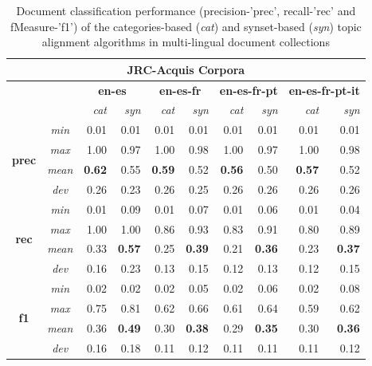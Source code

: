 \begin{table}[ht]\centering
\begin{center}
\small
\begin{tabular}{cc|rr||rr||rr||rr}
    \hline
    \multicolumn{10}{c}{\textbf{JRC-Acquis Corpora}} \\
    \hline
    & & \multicolumn{2}{c}{\textbf{en-es}} &
      \multicolumn{2}{c}{\textbf{en-es-fr}} &
      \multicolumn{2}{c}{\textbf{en-es-fr-pt}} &
      \multicolumn{2}{c}{\textbf{en-es-fr-pt-it}} \\
    & & {\textit{cat}} & {\textit{syn}} & {\textit{cat}} & {\textit{syn}} & {\textit{cat}} & {\textit{syn}} & {\textit{cat}} & {\textit{syn}} \\
    \hline
    \multirow{4}{*}{\textbf{prec}} 
    &{\textit{min}}     &0.01 &0.01 &0.01 &0.01 &0.01 &0.01 &0.01 &0.01\\
    &{\textit{max}}     &1.00 &0.97 &1.00 &0.98 &1.00 &0.97 &1.00 &0.98\\
    &{\textit{mean}}    &\textbf{0.62} &0.55 &\textbf{0.59} &0.52 &\textbf{0.56} &0.50 &\textbf{0.57} &0.52\\
    &{\textit{dev}}     &0.26 &0.23 &0.26 &0.25 &0.26 &0.26 &0.26 &0.26\\
    \hline
    \multirow{4}{*}{\textbf{rec}} 
    &{\textit{min}}     &0.01 &0.09 &0.01 &0.07 &0.01 &0.06 &0.01 &0.04\\
    &{\textit{max}}     &1.00 &1.00 &0.86 &0.93 &0.83 &0.91 &0.80 &0.89\\
    &{\textit{mean}}    &0.33 &\textbf{0.57} &0.25 &\textbf{0.39} &0.21 &\textbf{0.36} &0.23 &\textbf{0.37}\\
    &{\textit{dev}}     &0.16 &0.23 &0.13 &0.15 &0.12 &0.13 &0.12 &0.15\\
    \hline
    \multirow{4}{*}{\textbf{f1}} 
    &{\textit{min}}     &0.02 &0.02 &0.02 &0.05 &0.02 &0.06 &0.02 &0.08\\
    &{\textit{max}}     &0.75 &0.81 &0.62 &0.66 &0.61 &0.64 &0.59 &0.62\\
    &{\textit{mean}}    &0.36 &\textbf{0.49} &0.30 &\textbf{0.38} &0.29 &\textbf{0.35} &0.30 &\textbf{0.36}\\
    &{\textit{dev}}     &0.16 &0.18 &0.11 &0.12 &0.11 &0.11 &0.11 &0.12\\
\end{tabular}
\end{center}
\caption{Document classification performance (precision-'prec', recall-'rec' and fMeasure-'f1') of the categories-based (\textit{cat}) and synset-based (\textit{syn}) topic alignment algorithms in multi-lingual document collections}
\label{tb:multi-class}
\end{table}

